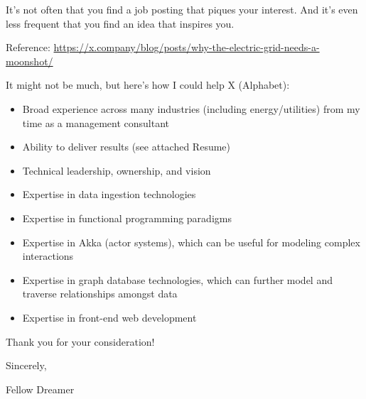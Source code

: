 \documentclass{article}
\begin{document}
It's not often that you find a job posting that piques your interest. And it's even less frequent that you find an idea that inspires you.

Reference: \url{https://x.company/blog/posts/why-the-electric-grid-needs-a-moonshot/}

\bigskip %

It might not be much, but here's how I could help X (Alphabet):

\begin{itemize}
  \item Broad experience across many industries (including energy/utilities) from my time as a management consultant
  \item Ability to deliver results (see attached Resume)
	\item Technical leadership, ownership, and vision
  \item Expertise in data ingestion technologies
  \item Expertise in functional programming paradigms
  \item Expertise in Akka (actor systems), which can be useful for modeling complex interactions
  \item Expertise in graph database technologies, which can further model and traverse relationships amongst data
	\item Expertise in front-end web development
\end{itemize}

Thank you for your consideration!

\bigskip %

Sincerely,

\vspace{50pt} %

Fellow Dreamer
\end{document}
